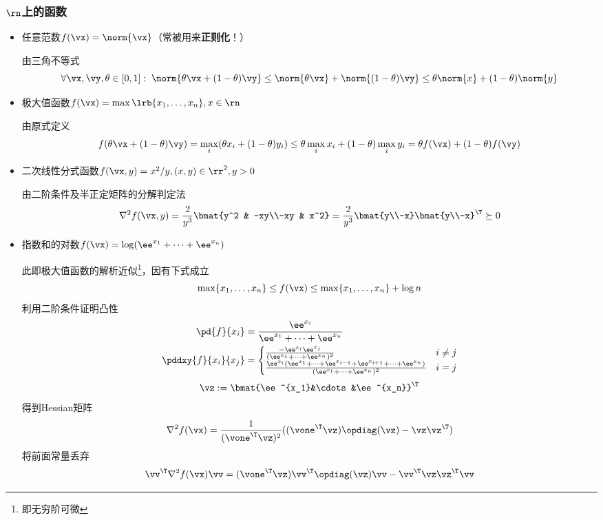 \subsubsection{$\rn$上的函数}
\begin{itemize}
	\item 任意范数$f(\vx)=\norm{\vx}$（常被用来\textbf{正则化}！）
\begin{analysis}
	由三角不等式
\[\forall \vx,\vy,\theta\in[0,1]:\;
\norm{\theta \vx+(1-\theta)\vy}\leq \norm{\theta \vx}+\norm{(1-\theta)\vy}\leq \theta \norm{x}+(1-\theta)\norm{y}\]
\end{analysis}
	\item 极大值函数$f(\vx)=\max\lrb{x_1,\ldots,x_n},x\in\rn$
\begin{analysis}
	由原式定义
	\[f(\theta\vx+(1-\theta)\vy)=\max_i(\theta x_i+(1-\theta)y_i)\leq\theta\max_i x_i+(1-\theta)\max_i y_i=\theta f(\vx)+(1-\theta)f(\vy)\]
\end{analysis}
	\item 二次线性分式函数$f(\vx,y)=x^2/y,(x,y)\in\rr^2,y>0$
\begin{analysis}
	由二阶条件及半正定矩阵的分解判定法
	\[\nabla^2f(\vx,y)=\frac{2}{y^3}\bmat{y^2 & -xy\\-xy & x^2}=\frac{2}{y^3}\bmat{y\\-x}\bmat{y\\-x}^\T\succeq 0\]
\end{analysis}
	\item 指数和的对数$f(\vx)=\log(\ee^{x_1}+\cdots+\ee^{x_n})$
\begin{analysis}
此即极大值函数的解析近似\footnote{即无穷阶可微}，因有下式成立
\[\max\{x_1,\ldots,x_n\}\leq f(\vx)\leq\max\{x_1,\ldots,x_n\}+\log n\]
利用二阶条件证明凸性
\[\begin{aligned}
\pd{f}{x_i}&=\frac{\ee^{x_i}}{\ee^{x_1}+\cdots+\ee^{x_n}}\\
\pddxy{f}{x_i}{x_j}&=
\begin{cases}
\frac{-\ee^{x_i}\ee^{x_j}}{(\ee^{x_1}+\cdots+\ee^{x_n})^2} & i\ne j\\
\frac{\ee^{x_i}(\ee^{x_1}+\cdots+\ee^{x_{i-1}}+\ee^{x_{i+1}}+\cdots+\ee^{x_n})}{(\ee^{x_1}+\cdots+\ee^{x_n})^2} & i=j
\end{cases}
\end{aligned}\]
\[\vz:=\bmat{\ee^{x_1}&\cdots&\ee^{x_n}}^\T\]
得到Hessian矩阵
\[\nabla^2f(\vx)=\frac{1}{(\vone^\T \vz)^2}((\vone^\T \vz)\opdiag(\vz)-\vz \vz^\T)\]
将前面常量丢弃
\[\begin{aligned}
\vv^\T \nabla^2f(\vx)\vv&=(\vone^\T \vz)\vv^\T \opdiag(\vz)\vv-\vv^\T \vz\vz^\T \vv\\

\end{aligned}\]
\end{analysis}
\end{itemize}
